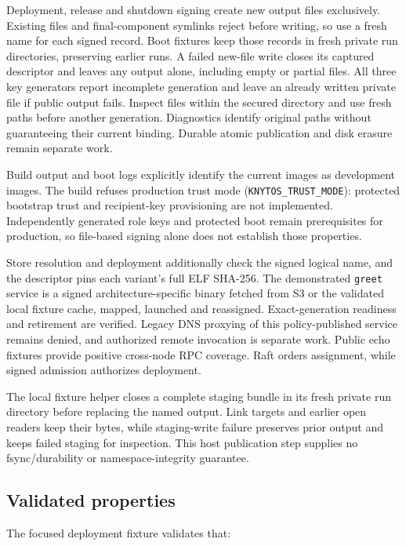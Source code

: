 Deployment, release and shutdown signing create new output files exclusively.
Existing files and final-component symlinks reject before writing, so use a fresh
name for each signed record. Boot fixtures keep those records in fresh private
run directories, preserving earlier runs. A failed new-file write closes its
captured descriptor and leaves any output alone, including empty or partial
files. All three key generators report incomplete generation and leave an
already written private file if public output fails. Inspect files within the
secured directory and use fresh paths before another generation. Diagnostics
identify original paths without guaranteeing their current binding. Durable
atomic publication and disk erasure remain separate work.

Build output and boot logs explicitly identify the current images as
development images. The build refuses production trust mode
(\texttt{KNYTOS\_TRUST\_MODE}): protected bootstrap trust and recipient-key provisioning
are not implemented. Independently generated role keys and protected boot
remain prerequisites for production, so file-based signing alone does not
establish those properties.

Store resolution and deployment additionally check the signed logical name,
and the descriptor pins each variant's full ELF SHA-256. The demonstrated
\texttt{greet} service is a signed architecture-specific binary fetched from
S3 or the validated local fixture cache, mapped, launched and reassigned.
Exact-generation readiness and retirement are verified. Legacy DNS proxying of
this policy-published service remains denied, and authorized remote invocation is
separate work. Public echo fixtures provide positive cross-node RPC coverage.
Raft orders assignment, while signed admission authorizes deployment.

The local fixture helper closes a complete staging bundle in its fresh private
run directory before replacing the named output. Link targets and earlier open
readers keep their bytes, while staging-write failure preserves prior output and
keeps failed staging for inspection. This host publication step supplies no
fsync/durability or namespace-integrity guarantee.

\subsection{Validated properties}

The focused deployment fixture validates that:

